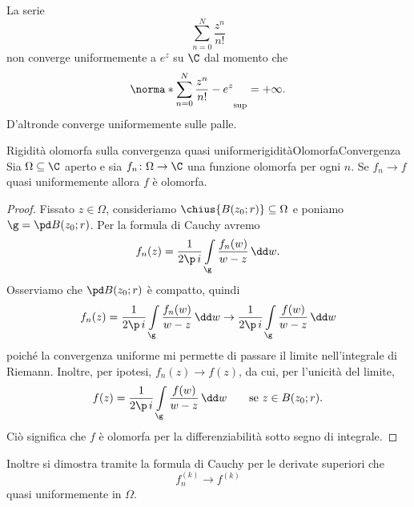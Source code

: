 \begin{ese}
	La serie
	\[
		\sum_{n=0}^N \frac{z^n}{n!}
	\]
	non converge uniformemente a \(e^z\) su \(\C\) dal momento che
	\[
		\norma*{\sum_{n=0}^N \frac{z^n}{n!}-e^z}_{\sup} = +\infty.
	\]
	D'altronde converge uniformemente sulle palle.
\end{ese}

\begin{teor}{Rigidità olomorfa sulla convergenza quasi uniforme}{rigiditàOlomorfaConvergenza}
	Sia \(\Omega\subseteq\C\) aperto e sia \(f_n\colon \Omega \to \C\) una funzione olomorfa per ogni \(n\).
	Se \(f_n \to f\) quasi uniformemente allora \(f\) è olomorfa.
\end{teor}

\begin{proof}
	Fissato \(z\in \Omega\), consideriamo \(\chius{B(z_0;r)}\subseteq \Omega\) e poniamo \(\g=\pd B(z_0;r)\).
	Per la formula di Cauchy avremo
	\[
		f_n(z) = \frac{1}{2\p\,i} \int\limits_\g \frac{f_n(w)}{w-z}\,\dd w.
	\]
	Osserviamo che \(\pd B(z_0;r)\) è compatto, quindi
	\[
		f_n(z) = \frac{1}{2\p\,i} \int\limits_\g \frac{f_n(w)}{w-z}\,\dd w \to \frac{1}{2\p\,i} \int\limits_\g \frac{f(w)}{w-z}\,\dd w
	\]
	poiché la convergenza uniforme mi permette di passare il limite nell'integrale di Riemann.
	Inoltre, per ipotesi, \(f_n(z) \to f(z)\), da cui, per l'unicità del limite,
	\[
		f(z)= \frac{1}{2\p\,i} \int\limits_\g \frac{f(w)}{w-z}\,\dd w \qquad\text{se }z\in B(z_0;r).
	\]
	Ciò significa che \(f\) è olomorfa per la differenziabilità sotto segno di integrale.
\end{proof}

\begin{oss}
	Inoltre si dimostra tramite la formula di Cauchy per le derivate superiori che
	\[
		f^{(k)}_n \to f^{(k)}
	\]
	quasi uniformemente in \(\Omega\).
\end{oss}